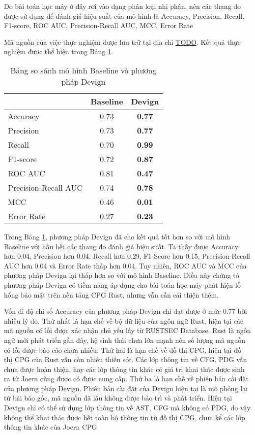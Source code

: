 Do bài toán học máy ở đây rơi vào dạng phân loại nhị phân, nên các thang đo được sử dụng để đánh giá hiệu suất của mô hình là Accuracy, Precision, Recall, F1-score, ROC AUC, Precision-Recall AUC, MCC, Error Rate

Mã nguồn của việc thực nghiệm được lưu trữ tại địa chỉ \href{TODO}{TODO}.
Kết quả thực nghiệm được thể hiện trong Bảng \ref{table:c4_ml}.

\begin{table}[H]
    \centering
    \caption{Bảng so sánh mô hình Baseline và phương pháp Devign}
    \label{table:c4_ml}
    \begin{tabular}{l @{\hskip 2cm} c @{\hskip 2cm} c}
        \hline
         & Baseline & Devign \\
        \hline
        Accuracy & 0.73 & \textbf{0.77} \\
        Precision & 0.73 & \textbf{0.77} \\
        Recall & 0.70 & \textbf{0.99} \\
        F1-score & 0.72 & \textbf{0.87} \\
        ROC AUC & 0.81 & \textbf{0.47} \\
        Precision-Recall AUC & 0.74 & \textbf{0.78} \\
        MCC & 0.46 & \textbf{0.01} \\
        Error Rate & 0.27 & \textbf{0.23} \\
        \hline
    \end{tabular}
\end{table}

Trong Bảng \ref{table:c4_ml}, phương pháp Devign đã cho kết quả tốt hơn so với mô hình Baseline với hầu hết các thang đo đánh giá hiệu suất.
Ta thấy được Accuracy hơn 0.04, Precision hơn 0.04, Recall hơn 0.29, F1-Score hơn 0.15, Precision-Recall AUC hơn 0.04 và Error Rate thấp hơn 0.04.
Tuy nhiên, ROC AUC và MCC của phương pháp Devign lại thấp hơn so với mô hình Baseline.
Điều này chứng tỏ phương pháp Devign có tiềm năng áp dụng cho bài toán học máy phát hiện lỗ hổng bảo mật trên nền tảng CPG Rust, nhưng vẫn cần cải thiện thêm.

Vốn dĩ độ chỉ số Accuracy của phương pháp Devign chỉ đạt được ở mức 0.77 bời nhiều lý do.
Thứ nhất là hạn chế về bộ dữ liệu của ngôn ngữ Rust, hiện tại các mã nguồn có lỗi được xác nhận chủ yếu lấy từ RUSTSEC Database.
Rust là ngôn ngữ mới phát triển gần đây, hệ sinh thái chưa lớn mạnh nên số lượng mã nguồn có lỗi được báo cáo chưa nhiều.
Thứ hai là hạn chế về đồ thị CPG, hiện tại đồ thị CPG của Rust vẫn còn nhiều thiếu sót.
Các lớp thông tin về CFG, PDG vẫn chưa được hoàn thiện, hay các lớp thông tin khác có giá trị khai thác được sinh ra từ Joern cũng được có được cung cấp.
Thứ ba là hạn chế về phiên bản cài đặt của phương pháp Devign.
Phiên bản cài đặt của Devign hiện tại là mô phỏng lại từ bài báo gốc, mã nguồn đã lâu không được bảo trì và phát triển.
Hiện tại Devign chỉ có thể sử dụng lớp thông tin về AST, CFG mà không có PDG, do vậy không thể khai thác được hết toàn bộ thông tin từ đồ thị CPG, chưa kể các lớp thông tin khác của Joern CPG.


